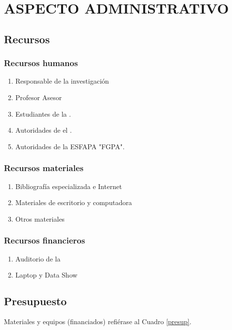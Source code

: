 \documentclass[12pt,a4paper]{article}
\begin{document}


\section{ASPECTO  ADMINISTRATIVO}
\subsection{Recursos}

\subsubsection{Recursos humanos}
\begin{enumerate}
	\item Responsable de la investigación
	\item Profesor Asesor
	\item Estudiantes de la \lugar.
	\item Autoridades de el \lugar.
	\item Autoridades de la ESFAPA "FGPA".
\end{enumerate}

\subsubsection{Recursos materiales}
\begin{enumerate}
	\item Bibliografía especializada e Internet %
	\item Materiales de escritorio y computadora %
	\item Otros materiales %
\end{enumerate}

\subsubsection{Recursos financieros}
\begin{enumerate}
	\item Auditorio de la \lugar
	\item Laptop y Data Show
\end{enumerate}

\subsection{Presupuesto}
Materiales y equipos (financiados) refiérase al Cuadro \ref{presup}.
\end{document}
